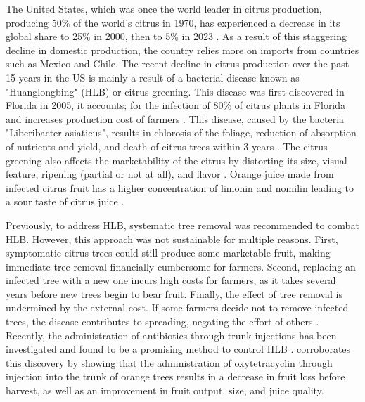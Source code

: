 \documentclass[12pt]{article}
\begin{document}
 The United States, which was once the world leader in citrus production, producing 50\% of the world's citrus in 1970, has experienced a decrease in its global share to 25\% in 2000, then to 5\% in 2023 \citep{munch_us_2023} . As a result of this staggering decline in domestic production, the country relies more on imports from countries such as Mexico and Chile. The recent decline in citrus production over the past 15 years in the US is mainly a result of a bacterial disease known as "Huanglongbing" (HLB) or citrus greening. This disease was first discovered in Florida in 2005, it accounts; for the infection of 80\% of citrus plants in Florida \citep{li2020citrus} and increases  production cost of farmers \citep{roka2009citrus} . This disease, caused by the bacteria "Liberibacter asiaticus", results in chlorosis of the foliage, reduction of absorption of nutrients and yield, and death of citrus trees within 3 years \citep{bove_huanglongbing_2006}. The citrus greening also affects the marketability of the citrus by distorting its size, visual feature, ripening (partial or not at all), and flavor \citep{farnsworth_potential_2024}. Orange juice made from infected citrus fruit has a higher concentration of limonin and nomilin leading to a sour taste of citrus juice \citep{paula2018active}. 

Previously, to address HLB, systematic tree removal was recommended to combat HLB. However, this approach was not sustainable for multiple reasons. First, symptomatic citrus trees could still produce some marketable fruit, making immediate tree removal financially cumbersome for farmers. Second, replacing an infected tree with a new one incurs high costs for farmers, as it takes several years before new trees begin to bear fruit.  Finally, the effect of tree removal is undermined by the external cost. If some farmers decide not to remove infected trees, the disease contributes to spreading, negating the effort of others \citep{farnsworth_potential_2024}. Recently, the administration of antibiotics through trunk injections has been investigated and found to be a promising method to control HLB \citep{li_precision_2022}. \citet{archer_trunk_2023} corroborates this discovery by showing that the administration of oxytetracyclin through injection into the trunk of orange trees results in a decrease in fruit loss before harvest, as well as an improvement in fruit output, size, and juice quality.
\end{document}
